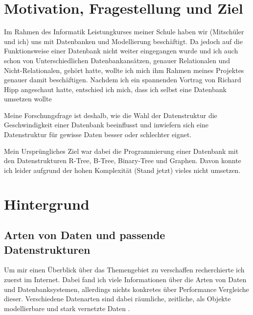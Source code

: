 \documentclass[11pt,a4paper]{article}
\begin{document}
\clearpage

\pagestyle{plain}

\section{Motivation, Fragestellung und Ziel}

Im Rahmen des Informatik Leistungkurses meiner Schule haben wir (Mitschüler und ich) uns
mit Datenbanken und Modellierung beschäftigt. Da jedoch auf die Funktionsweise einer
Datenbank nicht weiter eingegangen wurde und ich auch schon von Unterschiedlichen
Datenbankansätzen, genauer Relationalen und Nicht-Relationalen, gehört hatte,
wollte ich mich ihm Rahmen meines Projektes genauer damit beschäftigen.
Nachdem ich ein spannenden Vortrag von Richard Hipp angeschaut hatte,
entschied ich mich, dass ich selbst eine Datenbank umsetzen wollte \cite{sql_ideas}

\vspace*{0.3cm}

Meine Forschungsfrage ist deshalb, wie die Wahl der Datenstruktur die
Geschwindigkeit einer Datenbank beeinflusst und inwiefern sich eine Datenstruktur
für gewisse Daten besser oder schlechter eignet.

\vspace*{0.3cm}

Mein Ursprüngliches Ziel war dabei die Programmierung einer Datenbank
mit den Datenstrukturen R-Tree, B-Tree, Binary-Tree und Graphen.
Davon konnte ich leider aufgrund der hohen Komplexität (Stand jetzt) vieles nicht umsetzen.

\section{Hintergrund}

\subsection{Arten von Daten und passende Datenstrukturen}

Um mir einen Überblick über das Themengebiet zu verschaffen recherchierte ich zuerst im Internet.
Dabei fand ich viele Informationen über die Arten von Daten und Datenbanksystemen,
allerdings nichts konkretes über Performance Vergleiche dieser.
Verschiedene Datenarten sind dabei räumliche, zeitliche, als Objekte modellierbare und stark vernetzte Daten
\cite{no_sql_wikipedia} \cite{indian_overview}.

\vspace*{0.3cm}
\end{document}
